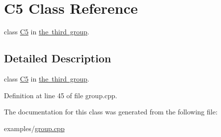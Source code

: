 \hypertarget{class_c5}{}\section{C5 Class Reference}
\label{class_c5}


class \mbox{\hyperlink{class_c5}{C5}} in \mbox{\hyperlink{group__group3}{the third group}}.  




\subsection{Detailed Description}
class \mbox{\hyperlink{class_c5}{C5}} in \mbox{\hyperlink{group__group3}{the third group}}. 

Definition at line 45 of file group.\+cpp.



The documentation for this class was generated from the following file\+:\begin{DoxyCompactItemize}
\item 
examples/\mbox{\hyperlink{group_8cpp}{group.\+cpp}}\end{DoxyCompactItemize}
